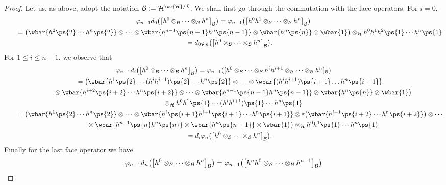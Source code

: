 \begin{proof}
Let us, as above, adopt the notation ${\cal B}:={\cal H}^{\co{\cal H}/{\cal I}}$.
We shall f\/irst go through the commutation with the face operators.
For $i=0$,
\begin{gather*}
\varphi_{n-1}d_0\big(\big[h^0\otimes_{\cal B}\cdots\otimes_{\cal B} h^n\big]_{\cal B}\big) =\varphi_{n-1}\big(\big[h^0h^1\otimes_{\cal
B}\cdots\otimes_{\cal B} h^n\big]_{\cal B}\big)
\\
\qquad
=\big(\wbar{h^2\ps{2}\cdots h^n\ps{2}} \otimes\cdots\otimes \wbar{h^{n-1}\ps{n-1}h^n\ps{n-1}} \otimes \wbar{h^n\ps{n}}
\otimes \wbar{1}\big) \otimes_{\cal H} h^0h^1h^2\ps{1}\cdots h^n\ps{1}
\\
\qquad
=d_0\varphi_{n}\big(\big[h^0\otimes_{\cal B}\cdots\otimes_{\cal B} h^n\big]_{\cal B}\big).
\end{gather*}
For $1\leq i \leq n-1$, we observe that
\begin{gather*}
\varphi_{n-1}d_i\big(\big[h^0\otimes_{\cal B}\cdots\otimes_{\cal B} h^n\big]_{\cal B}\big) =\varphi_{n-1}([h^0\otimes_{\cal
B}\cdots\otimes_{\cal B} h^ih^{i+1}\otimes_{\cal B}\cdots\otimes_{\cal B} h^n]_{\cal B})
\\
\qquad
=\big(\wbar{h^1\ps{2}\cdots(h^ih^{i+1})\ps{2}\cdots h^n\ps{2}} \otimes\cdots\otimes \wbar{(h^ih^{i+1})\ps{i+1}\dots
h^n\ps{i+1}}
\\
\qquad
\phantom{=}{}\otimes\wbar{h^{i+2}\ps{i+2}\cdots h^n\ps{i+2}}\otimes\cdots
\otimes\wbar{h^{n-1}\ps{n-1}h^n\ps{n-1}} \otimes \wbar{h^n\ps{n}} \otimes \wbar{1}\big)\\
\qquad
\phantom{=}{}
 \otimes_{\cal H}
h^0h^1\ps{1}\cdots(h^ih^{i+1})\ps{1}\cdots h^n\ps{1}
\\
\qquad
=\big(\wbar{h^1\ps{2}\cdots h^n\ps{2}} \otimes\cdots\otimes \wbar{h^i\ps{i+1}h^{i+1}\ps{i+1}\cdots h^n\ps{i+1}}\otimes
\varepsilon\big(\wbar{h^{i+1}\ps{i+2}\cdots h^n\ps{i+2}}\big) \otimes\cdots
\\
\qquad
\phantom{=}{}
\otimes \wbar{h^{n-1}\ps{n}h^n\ps{n}} \otimes \wbar{h^n\ps{n+1}} \otimes \wbar{1}\big) \otimes_{\cal H}
h^0h^1\ps{1}\cdots h^n\ps{1}
\\
\qquad
=d_i\varphi_{n}\big(\big[h^0\otimes_{\cal B}\cdots\otimes_{\cal B} h^n\big]_{\cal B}\big).
\end{gather*}
Finally for the last face operator we have
\begin{gather*}
\varphi_{n-1}d_n\big(\big[h^0\otimes_{\cal B}\cdots\otimes_{\cal B} h^n\big]_{\cal B}\big) =\varphi_{n-1}\big(\big[h^nh^0\otimes_{\cal
B}\cdots\otimes_{\cal B} h^{n-1}\big]_{\cal B}\big)

\end{gather*}
\end{proof}

